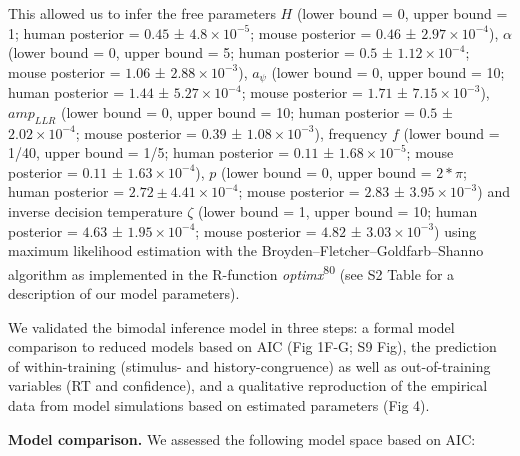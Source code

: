 \documentclass[
]{article}
\begin{document}
This allowed us to infer the free parameters \(H\) (lower bound = 0,
upper bound = 1; human posterior = \(0.45\) ±
\(\ensuremath{4.8\times 10^{-5}}\); mouse posterior = \(0.46\) ±
\(\ensuremath{2.97\times 10^{-4}}\)), \(\alpha\) (lower bound = 0, upper
bound = 5; human posterior = \(0.5\) ±
\(\ensuremath{1.12\times 10^{-4}}\); mouse posterior = \(1.06\) ±
\(\ensuremath{2.88\times 10^{-3}}\)), \(a_{\psi}\) (lower bound = 0,
upper bound = 10; human posterior = \(1.44\) ±
\(\ensuremath{5.27\times 10^{-4}}\); mouse posterior = \(1.71\) ±
\(\ensuremath{7.15\times 10^{-3}}\)), \(amp_{LLR}\) (lower bound = 0,
upper bound = 10; human posterior = \(0.5\) ±
\(\ensuremath{2.02\times 10^{-4}}\); mouse posterior = \(0.39\) ±
\(\ensuremath{1.08\times 10^{-3}}\)), frequency \(f\) (lower bound =
1/40, upper bound = 1/5; human posterior = \(0.11\) ±
\(\ensuremath{1.68\times 10^{-5}}\); mouse posterior = \(0.11\) ±
\(\ensuremath{1.63\times 10^{-4}}\)), \(p\) (lower bound = 0, upper
bound = \(2*\pi\); human posterior =
\(2.72 ± \ensuremath{4.41\times 10^{-4}}\); mouse posterior = \(2.83\) ±
\(\ensuremath{3.95\times 10^{-3}}\)) and inverse decision temperature
\(\zeta\) (lower bound = 1, upper bound = 10; human posterior = \(4.63\)
± \(\ensuremath{1.95\times 10^{-4}}\); mouse posterior = \(4.82\) ±
\(\ensuremath{3.03\times 10^{-3}}\)) using maximum likelihood estimation
with the Broyden--Fletcher--Goldfarb--Shanno algorithm as implemented in
the R-function \emph{optimx}\textsuperscript{80} (see S2 Table for a description of our model parameters).

We validated the bimodal inference model in three steps: a formal model
comparison to reduced models based on AIC (Fig 1F-G; S9 Fig), the prediction of within-training (stimulus- and
history-congruence) as well as out-of-training variables (RT and
confidence), and a qualitative reproduction of the empirical data from
model simulations based on estimated parameters (Fig 4).

\textbf{Model comparison.} We assessed the following model space based
on AIC:
\end{document}
